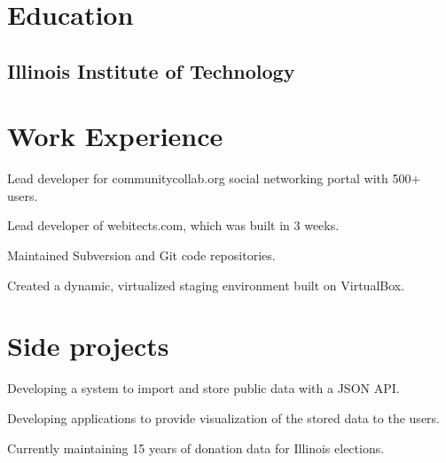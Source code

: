 \documentclass{resume}
\begin{document}
\author{Dmitry Ratnikov}
\maketitle

\section{Education}

\subsection{Illinois Institute of Technology}


\section{Work Experience}

\begin{compactitem}
  \item Lead developer for communitycollab.org social networking portal with 500+ users.
  \item Lead developer of webitects.com, which was built in 3 weeks.
  \item Maintained Subversion and Git code repositories.
  \item Created a dynamic, virtualized staging environment built on VirtualBox.
\end{compactitem}

\section{Side projects}
\begin{compactitem}
  \item Developing a system to import and store public data with a JSON API.
  \item Developing applications to provide visualization of the stored data to the users.
  \item Currently maintaining 15 years of donation data for Illinois elections.
\end{compactitem}
\end{document}
